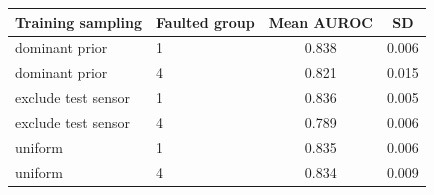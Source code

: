 \begin{tabular}{llcc}
\toprule
Training sampling & Faulted group & Mean AUROC & SD \\
\midrule
dominant prior & 1 & 0.838 & 0.006 \\
dominant prior & 4 & 0.821 & 0.015 \\
exclude test sensor & 1 & 0.836 & 0.005 \\
exclude test sensor & 4 & 0.789 & 0.006 \\
uniform & 1 & 0.835 & 0.006 \\
uniform & 4 & 0.834 & 0.009 \\
\bottomrule
\end{tabular}
